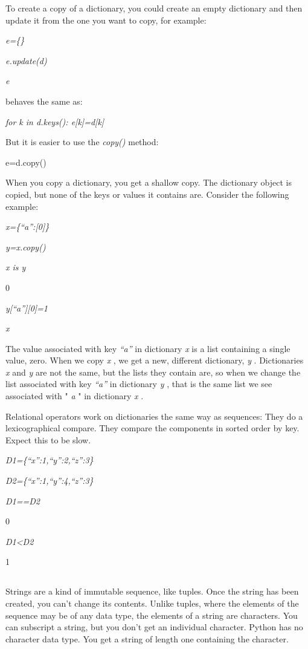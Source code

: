 To create a copy of a dictionary,
you could create an empty dictionary and then update it from the one you
want to copy, for example:


\emph{e=\{\}}


\emph{e.update(d)}


\emph{e}




behaves the same as:


\emph{for k in d.keys(): e{[}k{]}=d{[}k{]}}

But it is easier to use the
\emph{copy()} method:

e=d.copy()

When you copy a dictionary, you
get a shallow copy. The dictionary object is copied, but none of the
keys or values it contains are. Consider the following example:


\emph{x=\{``a'':{[}0{]}\}}


\emph{y=x.copy()}


\emph{x is y}

0


\emph{y{[}``a''{]}{[}0{]}=1}


\emph{x}



The value associated with key
\emph{``a''} in dictionary \emph{x} is a list containing a single value,
zero. When we copy \emph{x} , we get a new, different dictionary,
\emph{y} . Dictionaries \emph{x} and \emph{y} are not the same, but the
lists they contain are, so when we change the list associated with key
\emph{``a''} in dictionary \emph{y} , that is the same list we see
associated with " \emph{a} " in dictionary \emph{x} .

Relational operators work on
dictionaries the same way as sequences: They do a lexicographical
compare. They compare the components in sorted order by key. Expect this
to be slow.


\emph{D1=\{``x'':1,``y'':2,``z'':3\}}


\emph{D2=\{``x'':1,``y'':4,``z'':3\}}


\emph{D1==D2}

0


\emph{D1\textless{}D2}

1

\subsection[Strings]{}

Strings are a kind of immutable
sequence, like tuples. Once the string has been created, you can't
change its contents. Unlike tuples, where the elements of the sequence
may be of any data type, the elements of a string are characters. You
can subscript a string, but you don't get an individual character.
Python has no character data type. You get a string of length one
containing the character.

